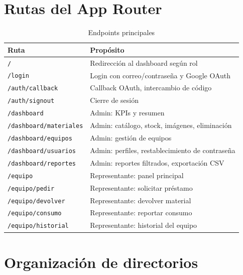 \documentclass[12pt,a4paper,oneside]{report}
\newcommand{\file}[1]{\texttt{\color{cecyteDark}#1}}
\begin{document}
\section{Rutas del App Router}

\begin{table}[H]
\centering
\caption{Endpoints principales}
\begin{tabular}{@{}L{5.5cm}L{10cm}@{}}
\toprule
{}
\textbf{Ruta} & \textbf{Propósito} \\
\midrule
\file{/}                          & Redirección al dashboard según rol \\
\file{/login}                     & Login con correo/contraseña y Google OAuth \\
\file{/auth/callback}             & Callback OAuth, intercambio de código \\
\file{/auth/signout}              & Cierre de sesión \\
\file{/dashboard}                 & Admin: KPIs y resumen \\
\file{/dashboard/materiales}      & Admin: catálogo, stock, imágenes, eliminación \\
\file{/dashboard/equipos}         & Admin: gestión de equipos \\
\file{/dashboard/usuarios}        & Admin: perfiles, restablecimiento de contraseña \\
\file{/dashboard/reportes}        & Admin: reportes filtrados, exportación CSV \\
\file{/equipo}                    & Representante: panel principal \\
\file{/equipo/pedir}              & Representante: solicitar préstamo \\
\file{/equipo/devolver}           & Representante: devolver material \\
\file{/equipo/consumo}            & Representante: reportar consumo \\
\file{/equipo/historial}          & Representante: historial del equipo \\
\bottomrule
\end{tabular}
\end{table}

\section{Organización de directorios}
\end{document}
